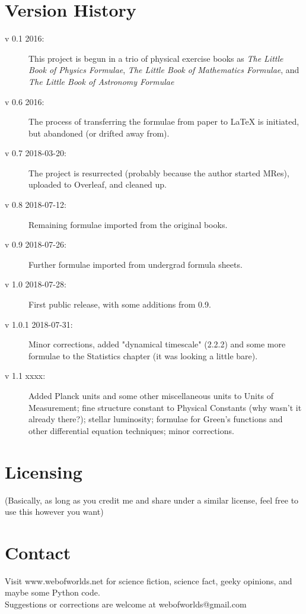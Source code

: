 \documentclass[]{report}
\begin{document}
\section{Version History}
\begin{description}
\item[v 0.1 2016:] This project is begun in a trio of physical exercise books as \textit{The Little Book of Physics Formulae}, \textit{The Little Book of Mathematics Formulae}, and \textit{The Little Book of Astronomy Formulae}
\item[v 0.6 2016:] The process of transferring the formulae from paper to LaTeX is initiated, but abandoned (or drifted away from).
\item[v 0.7 2018-03-20:] The project is resurrected (probably because the author started MRes), uploaded to Overleaf, and cleaned up.
\item[v 0.8 2018-07-12:] Remaining formulae imported from the original books.
\item[v 0.9 2018-07-26:] Further formulae imported from undergrad formula sheets.
\item[v 1.0 2018-07-28:] First public release, with some additions from 0.9.
\item[v 1.0.1 2018-07-31:] Minor corrections, added "dynamical timescale" (2.2.2) and some more formulae to the Statistics chapter (it was looking a little bare).
\item[v 1.1 xxxx:] Added Planck units and some other miscellaneous units to Units of Measurement; fine structure constant to Physical Constants (why wasn't it already there?); stellar luminosity; formulae for Green's functions and other differential equation techniques; minor corrections.
\end{description}

\section{Licensing}

\doclicenseThis
    
(Basically, as long as you credit me and share under a similar license, feel free to use this however you want)

\section{Contact}
    	
Visit www.webofworlds.net for science fiction, science fact, geeky opinions, and maybe some Python code. \\ 
Suggestions or corrections are welcome at webofworlds@gmail.com
\end{document}
